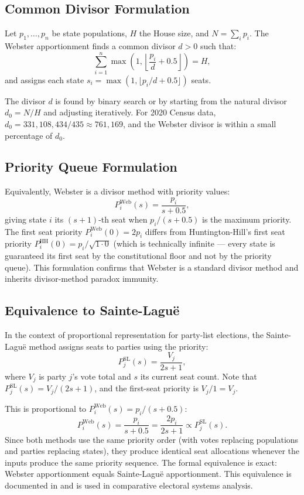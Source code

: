 \subsection{Common Divisor Formulation}

\begin{definition}
  Let $p_1, \ldots, p_n$ be state populations, $H$ the House size,
  and $N = \sum_i p_i$.
  The Webster apportionment finds a common divisor $d > 0$ such that:
  \[
    \sum_{i=1}^{n} \max\!\left(1, \left\lfloor \frac{p_i}{d} + 0.5 \right\rfloor\right) = H,
  \]
  and assigns each state $s_i = \max(1, \lfloor p_i/d + 0.5 \rfloor)$ seats.
\end{definition}

\noindent
The divisor $d$ is found by binary search or by starting from the natural
divisor $d_0 = N/H$ and adjusting iteratively.
For 2020 Census data, $d_0 = 331{,}108{,}434 / 435 \approx 761{,}169$,
and the Webster divisor is within a small percentage of $d_0$.

\subsection{Priority Queue Formulation}

Equivalently, Webster is a divisor method with priority values:
\[
  P_i^{\text{Web}}(s) = \frac{p_i}{s + 0.5},
\]
giving state $i$ its $(s+1)$-th seat when $p_i/(s+0.5)$ is the
maximum priority.
The first seat priority $P_i^{\text{Web}}(0) = 2p_i$ differs from
Huntington-Hill's first seat priority $P_i^{\text{HH}}(0) = p_i/\sqrt{1\cdot0}$
(which is technically infinite --- every state is guaranteed its first
seat by the constitutional floor and not by the priority queue).
This formulation confirms that Webster is a standard divisor method
and inherits divisor-method paradox immunity.

\subsection{Equivalence to Sainte-Lagu\"e}

In the context of proportional representation for party-list elections,
the Sainte-Lagu\"e method assigns seats to parties using the priority:
\[
  P_j^{\text{SL}}(s) = \frac{V_j}{2s+1},
\]
where $V_j$ is party $j$'s vote total and $s$ its current seat count.
Note that $P_j^{\text{SL}}(s) = V_j / (2s+1)$, and the first-seat
priority is $V_j / 1 = V_j$.

This is proportional to $P_i^{\text{Web}}(s) = p_i/(s+0.5)$:
\[
  P_i^{\text{Web}}(s) = \frac{p_i}{s + 0.5} = \frac{2 p_i}{2s + 1}
  \propto P_j^{\text{SL}}(s).
\]
Since both methods use the same priority order (with votes replacing
populations and parties replacing states), they produce identical
seat allocations whenever the inputs produce the same priority sequence.
The formal equivalence is exact: Webster apportionment equals
Sainte-Lagu\"e apportionment.
This equivalence is documented in \citet{lijphart1994electoral}
and is used in comparative electoral systems analysis.

